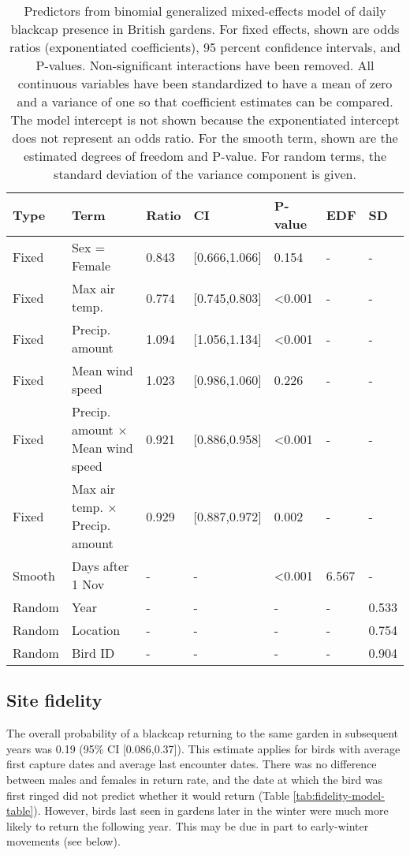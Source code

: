 \documentclass[a4paper, nobind]{templates/ociamthesis}
\begin{document}
\begin{table}[t]

\caption{\label{tab:indiv-model-table}Predictors from binomial generalized mixed-effects model of daily blackcap presence in British gardens. For fixed effects, shown are odds ratios (exponentiated coefficients), 95 percent confidence intervals, and P-values. Non-significant interactions have been removed. All continuous variables have been standardized to have a mean of zero and a variance of one so that coefficient estimates can be compared. The model intercept is not shown because the exponentiated intercept does not represent an odds ratio. For the smooth term, shown are the estimated degrees of freedom and P-value. For random terms, the standard deviation of the variance component is given.}
\centering
\fontsize{9.5}{11.5}\selectfont
\begin{tabular}{l|>{\raggedright\arraybackslash}p{9em}|l|l|l|l|l}
\hline
Type & Term & Ratio & CI & P-value & EDF & SD\\
\hline
Fixed & Sex = Female & 0.843 & [0.666,1.066] & 0.154 & - & -\\
\hline
Fixed & Max air temp. & 0.774 & [0.745,0.803] & <0.001 & - & -\\
\hline
Fixed & Precip. amount & 1.094 & [1.056,1.134] & <0.001 & - & -\\
\hline
Fixed & Mean wind speed & 1.023 & [0.986,1.060] & 0.226 & - & -\\
\hline
Fixed & Precip. amount $\times$ Mean wind speed & 0.921 & [0.886,0.958] & <0.001 & - & -\\
\hline
Fixed & Max air temp. $\times$ Precip. amount & 0.929 & [0.887,0.972] & 0.002 & - & -\\
\hline
Smooth & Days after 1 Nov & - & - & <0.001 & 6.567 & -\\
\hline
Random & Year & - & - & - & - & 0.533\\
\hline
Random & Location & - & - & - & - & 0.754\\
\hline
Random & Bird ID & - & - & - & - & 0.904\\
\hline
\end{tabular}
\end{table}

\hypertarget{site-fidelity-1}{%
\subsection{Site fidelity}\label{site-fidelity-1}}

The overall probability of a blackcap returning to the same garden in subsequent years was 0.19 (95\% CI {[}0.086,0.37{]}). This estimate applies for birds with average first capture dates and average last encounter dates. There was no difference between males and females in return rate, and the date at which the bird was first ringed did not predict whether it would return (Table \ref{tab:fidelity-model-table}). However, birds last seen in gardens later in the winter were much more likely to return the following year. This may be due in part to early-winter movements (see below).
\end{document}
